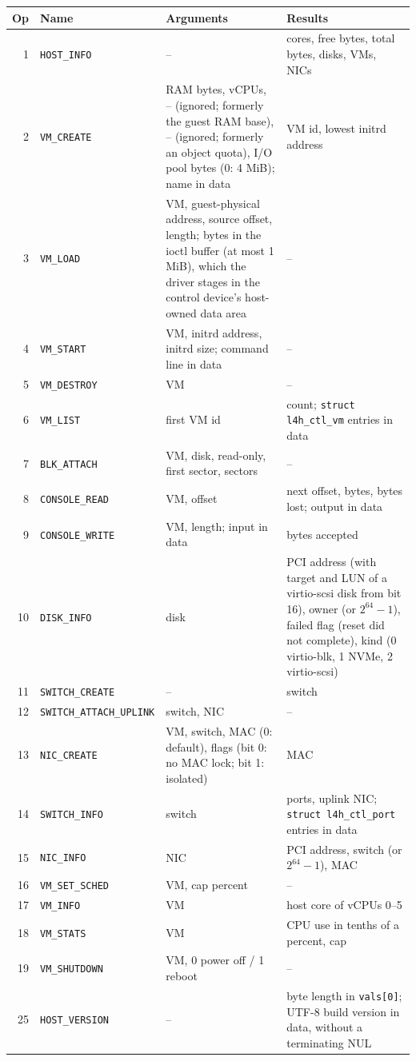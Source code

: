 \documentclass[11pt,a4paper]{report}
\begin{document}
\begin{longtable}{@{}r>{\raggedright\arraybackslash}p{3.6cm}>{\raggedright\arraybackslash}p{4.6cm}>{\raggedright\arraybackslash}p{4.7cm}@{}}
\toprule
Op & Name & Arguments & Results \\
\midrule
\endhead
1 & \texttt{HOST\_INFO} & -- & cores, free bytes, total bytes, disks, VMs,
  NICs \\
2 & \texttt{VM\_CREATE} & RAM bytes, vCPUs, -- (ignored; formerly the
  guest RAM base), -- (ignored; formerly an object quota), I/O pool bytes
  (0: 4 MiB); name in data & VM id, lowest initrd address \\

3 & \texttt{VM\_LOAD} & VM, guest-physical address, source offset, length;
  bytes in the ioctl buffer
  (at most 1 MiB), which the driver stages in the control device's
  host-owned data area & -- \\

4 & \texttt{VM\_START} & VM, initrd address, initrd size; command line
  in data & -- \\
5 & \texttt{VM\_DESTROY} & VM & -- \\
6 & \texttt{VM\_LIST} & first VM id & count; \texttt{struct l4h\_ctl\_vm}
  entries in data \\
7 & \texttt{BLK\_ATTACH} & VM, disk, read-only, first sector, sectors & -- \\
8 & \texttt{CONSOLE\_READ} & VM, offset & next offset, bytes, bytes lost;
  output in data \\
9 & \texttt{CONSOLE\_WRITE} & VM, length; input in data & bytes accepted \\
10 & \texttt{DISK\_INFO} & disk & PCI address (with target and LUN of a
  virtio-scsi disk from bit 16), owner (or $2^{64}-1$), failed
  flag (reset did not complete),
  kind (0 virtio-blk, 1 NVMe, 2 virtio-scsi) \\
11 & \texttt{SWITCH\_CREATE} & -- & switch \\
12 & \texttt{SWITCH\_ATTACH\_\allowbreak UPLINK} & switch, NIC & -- \\
13 & \texttt{NIC\_CREATE} & VM, switch, MAC (0: default), flags (bit 0:
  no MAC lock; bit 1: isolated) & MAC \\
14 & \texttt{SWITCH\_INFO} & switch & ports, uplink NIC; \texttt{struct
  l4h\_ctl\_port} entries in data \\
15 & \texttt{NIC\_INFO} & NIC & PCI address, switch (or $2^{64}-1$), MAC \\
16 & \texttt{VM\_SET\_SCHED} & VM, cap percent & -- \\
17 & \texttt{VM\_INFO} & VM & host core of vCPUs 0--5 \\
18 & \texttt{VM\_STATS} & VM & CPU use in tenths of a percent, cap \\
19 & \texttt{VM\_SHUTDOWN} & VM, 0 power off / 1 reboot & -- \\
25 & \texttt{HOST\_VERSION} & -- & byte length in \texttt{vals[0]}; UTF-8
  build version in data, without a terminating NUL \\
\bottomrule
\end{longtable}
\end{document}
